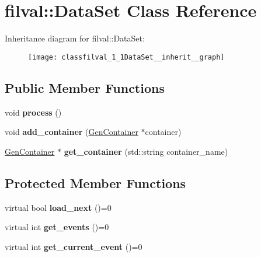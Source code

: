 \hypertarget{classfilval_1_1DataSet}{}\section{filval\+:\+:Data\+Set Class Reference}
\label{classfilval_1_1DataSet}


Inheritance diagram for filval\+:\+:Data\+Set\+:
\nopagebreak
\begin{figure}[H]
\begin{center}
\leavevmode
\texttt{[image: classfilval\_1\_1DataSet\_\_inherit\_\_graph]}
\end{center}
\end{figure}
\subsection*{Public Member Functions}
\begin{DoxyCompactItemize}
\item 
\hypertarget{classfilval_1_1DataSet_a54bd918683ce0a0b67a94d3a2be95141}{}\label{classfilval_1_1DataSet_a54bd918683ce0a0b67a94d3a2be95141} 
void {\bfseries process} ()
\item 
\hypertarget{classfilval_1_1DataSet_a40ac4810cadb55683a22853200e9b610}{}\label{classfilval_1_1DataSet_a40ac4810cadb55683a22853200e9b610} 
void {\bfseries add\+\_\+container} (\hyperlink{classfilval_1_1GenContainer}{Gen\+Container} $\ast$container)
\item 
\hypertarget{classfilval_1_1DataSet_acce42ebb5f3cad27cf7579903d858cf0}{}\label{classfilval_1_1DataSet_acce42ebb5f3cad27cf7579903d858cf0} 
\hyperlink{classfilval_1_1GenContainer}{Gen\+Container} $\ast$ {\bfseries get\+\_\+container} (std\+::string container\+\_\+name)
\end{DoxyCompactItemize}
\subsection*{Protected Member Functions}
\begin{DoxyCompactItemize}
\item 
\hypertarget{classfilval_1_1DataSet_abf2f7316650f3e5b2701bfa71d05dd9f}{}\label{classfilval_1_1DataSet_abf2f7316650f3e5b2701bfa71d05dd9f} 
virtual bool {\bfseries load\+\_\+next} ()=0
\item 
\hypertarget{classfilval_1_1DataSet_a03c8b97119d263e36cd059a5e0e3e47a}{}\label{classfilval_1_1DataSet_a03c8b97119d263e36cd059a5e0e3e47a} 
virtual int {\bfseries get\+\_\+events} ()=0
\item 
\hypertarget{classfilval_1_1DataSet_a079fa09c161568fa559c231d028b42f1}{}\label{classfilval_1_1DataSet_a079fa09c161568fa559c231d028b42f1} 
virtual int {\bfseries get\+\_\+current\+\_\+event} ()=0
\end{DoxyCompactItemize}
